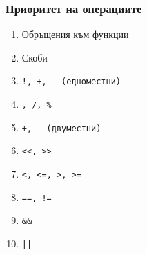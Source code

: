 \documentclass[alsotrans]{beamerswitch}
\begin{document}
\begin{frame}
  \frametitle{Приоритет на операциите}
  \begin{enumerate}
  \item Обръщения към функции
  \item Скоби
  \item \tt!, \tt+, \tt- (едноместни)
  \item \tt*, \tt/, \tt\%
  \item \tt+, \tt- (двуместни)
  \item \tt{<{}<}, \tt{>{}>}
  \item \tt{<}, \tt{<=}, \tt{>}, \tt{>=}
  \item \tt{==}, \tt{!=}
  \item \tt{\&\&}
  \item \tt{||}
  \end{enumerate}
\end{frame}
\end{document}
